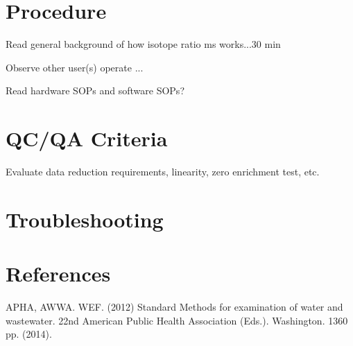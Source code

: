 \documentclass[12pt]{../SOP3_beta}\usepackage[]{graphicx}\usepackage[]{color}
\begin{document}
\newpage

\section{Procedure}

\NP Read general background of how isotope ratio ms works...30 min

\NP Observe other user(s) operate ...

\NP Read hardware SOPs and software SOPs?
\section{QC/QA Criteria}

\NP Evaluate data reduction requirements, linearity, zero enrichment test, etc.

\section{Troubleshooting}

\section{References}

\NP APHA, AWWA. WEF. (2012) Standard Methods for examination of water and wastewater. 22nd American Public Health Association (Eds.). Washington. 1360 pp. (2014).
\end{document}
